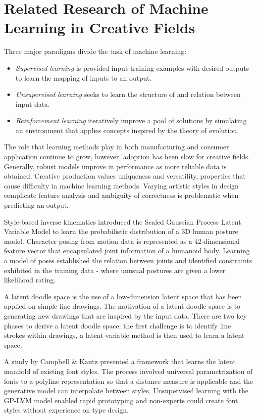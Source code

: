 \documentclass[ %
author={Dillon Keith Diep},
supervisor={Dr. Carl Henrik Ek},
degree={MEng},
title={ART-CG:},
subtitle={Assisted Real-time Content Generation of 3D Hair by Learning Manifolds},
type={Research},
year={2017} ]{dissertation}
\begin{document}
\section{Related Research of Machine Learning in Creative Fields}
Three major paradigms divide the task of machine learning:
\begin{itemize}
	\item \textit{Supervised learning} is provided input training examples with desired outputs to learn the mapping of inputs to an output.
	\item \textit{Unsupervised learning} seeks to learn the structure of and relation between input data.
	\item \textit{Reinforcement learning} iteratively improve a pool of solutions by simulating an environment that applies concepts inspired by the theory of evolution.
\end{itemize}
The role that learning methods play in both manufacturing and consumer application continue to grow, however, adoption has been slow for creative fields.  Generally, robust models improve in performance as more reliable data is obtained. Creative production values uniqueness and versatility, properties that cause difficulty in machine learning methods. Varying artistic styles in design complicate feature analysis and ambiguity of correctness is problematic when predicting an output.

Style-based inverse kinematics introduced the Scaled Gaussian Process Latent Variable Model to learn the probabilistic distribution of a 3D human posture model. \cite{styleik} Character posing from motion data is represented as a 42-dimensional feature vector that encapsulated joint information of a humanoid body. Learning a model of poses established the relation between joints and identified constraints exhibited in the training data - where unusual postures are given a lower likelihood rating.

A latent doodle space is the use of a low-dimension latent space that has been applied on simple line drawings. \cite{latentdoodle} The motivation of a latent doodle space is to generating new drawings that are inspired by the input data. There are two key phases to derive a latent doodle space: the first challenge is to identify line strokes within drawings, a latent variable method is then used to learn a latent space.

A study by Campbell \& Kautz presented a framework that learns the latent manifold of existing font styles. \cite{fontmanifold} The process involved universal parametrization of fonts to a polyline representation so that a distance measure is applicable and the generative model can interpolate between styles. Unsupervised learning with the GP-LVM model enabled rapid prototyping and non-experts could create font styles without experience on type design.
\end{document}
